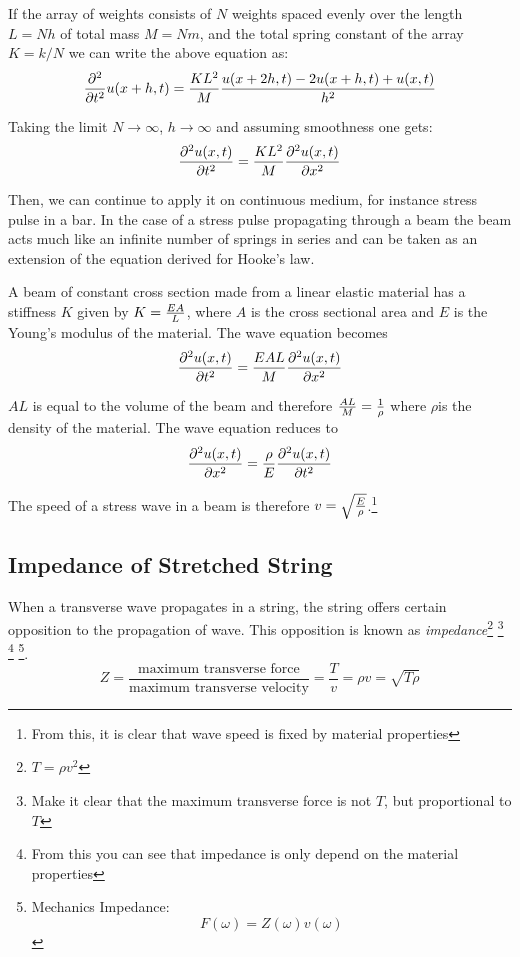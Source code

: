\documentclass[UTF8]{book}
\begin{document}
If the array of weights consists of $N$ weights spaced evenly over the length $L = Nh$ of total mass $M = Nm$, and the total spring constant of the array $K = k/N$ we can write the above equation as:
\[{\partial^2 \over \partial t^2} u(x+h,t)={KL^2 \over M}{u(x+2h,t)-2u(x+h,t)+u(x,t) \over h^2}\]

Taking the limit $N \to \infty$, $h \to \infty$ and assuming smoothness one gets:
\begin{equation}\label{eq:7}
{\partial^2 u(x,t) \over \partial t^2}={KL^2 \over M}{ \partial^2 u(x,t) \over \partial x^2 }
\end{equation}

Then, we can continue to apply it on continuous medium, for instance stress pulse in a bar. In the case of a stress pulse propagating through a beam the beam acts much like an infinite number of springs in series and can be taken as an extension of the equation derived for Hooke's law.

A beam of constant cross section made from a linear elastic material has a stiffness $K$ given by $K= {EA \over L}$, where $A$ is the cross sectional area and $E$ is the Young's modulus of the material. The wave equation becomes
\[{\partial^2 u(x,t) \over \partial t^2}={EAL \over M}{ \partial^2 u(x,t) \over \partial x^2 }\]

$AL$ is equal to the volume of the beam and therefore ${AL \over M}= {1 \over \rho}$ where $\rho$is the density of the material. The wave equation reduces to
\begin{equation}\label{eq:w2}
{ \partial^2 u(x,t) \over \partial x^2 }={ \rho\over E}{\partial^2 u(x,t) \over \partial t^2}
\end{equation}

The speed of a stress wave in a beam is therefore $v=\sqrt{E \over \rho}$.\footnote{From this, it is clear that wave speed is fixed by material properties}

\subsection{Impedance of Stretched String}
When a transverse wave propagates in a string, the string offers certain opposition to the propagation of wave. This opposition is known as \emph{impedance}\footnote{$T=\rho v^2$} \footnote{Make it clear that the maximum transverse force is not $T$, but proportional to $T$} \footnote{From this you can see that impedance is only depend on the material properties} \footnote{Mechanics Impedance: \[F(\omega )=Z(\omega )v(\omega )\]}. 
\[Z=\frac{\text{maximum transverse force}}{\text{maximum transverse velocity}}=\frac{T}{v}=\rho v=\sqrt{T\rho }\]
\end{document}
